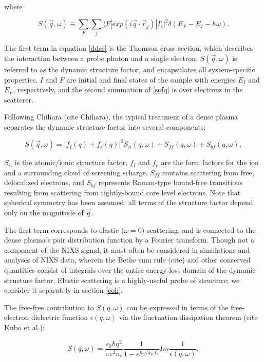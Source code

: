 \documentclass [11pt, proquest, article] {uwthesis}[2016/11/22]
\begin{document}
where 


\label{sofq}
\begin{equation}
S(\vec{q}, \omega) \equiv \sum_F  \sum_j\langle F|  exp(i \vec{q} \cdot \vec{r}_j) |I\rangle |^2 \delta(E_F - E_I - \hbar \omega).
\end{equation}

The first term in equation \ref{ddcs} is the Thomson cross section, which describes the interaction between a probe photon and a single electron; $S(\vec{q}, \omega)$ is referred to as the dynamic structure factor, and encapsulates all system-specific properties. $I$ and $F$ are initial and final states of the sample with energies $E_I$ and $E_F$, respectively, and the second summation of \ref{sofq} is over electrons in the scatterer.

Following Chihara (cite Chihara), the typical treatment of a dense plasma separates the dynamic structure factor into several components:

\begin{equation}
S(\vec{q}, \omega) = |f_I(q) + f_e(q)|^2 S_{ii}(q, \omega) + S_{ff}(q, \omega) + S_{bf}(q, \omega),
\end{equation}

$S_{ii}$ is the atomic/ionic structure factor, $f_I$ and $f_e$ are the form factors for the ion and a surrounding cloud of screening scharge. $S_{ff}$ contains scattering from free, delocalized electrons, and $S_{bf}$ represents Raman-type bound-free transitions resulting from scattering from tightly-bound core level electrons. Note that spherical symmetry has been assumed: all terms of the structure factor depend only on the magnitude of $\vec{q}$.

The first term corresponds to elastic ($\omega = 0$) scattering, and is connected to the dense plasma's pair distribution function by a Fourier transform. Though not a component of the NIXS signal, it must often be considered in simulations and analyses of NIXS data, wherein the Bethe sum rule (cite) and other conserved quantities consist of integrals over the entire energy-loss domain of the dynamic structure factor. Elastic scattering is a highly-useful probe of structure; we consider it separately in section \ref{coh}. 

The free-free contribution to $S(q, \omega)$ can be expressed in terms of the free-electron dielectric function $\epsilon(q, \omega)$  via the fluctuation-dissipation theorem (cite Kubo et al.):

\begin{equation}
S(q, \omega) = \frac{\epsilon_0 \hbar q^2}{\pi e^2 n_e} \frac{1}{1 - e^{\hbar \omega/k_B T_e}} Im\frac{1}{\epsilon(q, \omega)},
\end{equation}
\end{document}
